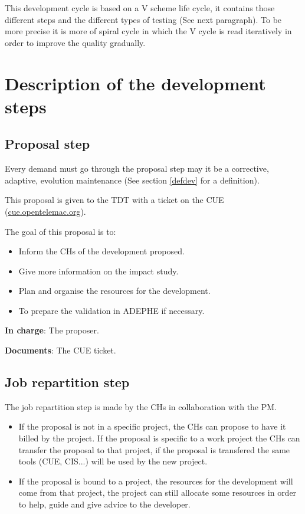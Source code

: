 This development cycle is based on a V scheme life cycle, it contains those
different steps and the different types of testing (See next paragraph). To be
more precise it is more of spiral cycle in which the V cycle is read
iteratively in order to improve the quality gradually. 

\section{Description of the development steps}
\label{dev}

\subsection{Proposal step}

Every demand must go through the proposal step may it be a corrective,
adaptive, evolution maintenance (See section \ref{defdev} for a definition).

This proposal is given to the TDT with a ticket on the CUE (\url{cue.opentelemac.org}).

The goal of this proposal is to:
\begin{itemize}
\item Inform the CHs of the development proposed.
\item Give more information on the impact study.
\item Plan and organise the resources for the development.
\item To prepare the validation in ADEPHE if necessary.
\end{itemize}

\textbf{In charge}: The proposer.

\textbf{Documents}: The CUE ticket.

\subsection{Job repartition step}
The job repartition step is made by the CHs in collaboration with the PM.
\begin{itemize}
\item If the proposal is not in a specific project, the CHs can propose to have
it billed by the \telemacsystem project. If the proposal is specific to a work project
the CHs can transfer the proposal to that project, if the proposal is
transfered the same tools (CUE, CIS...) will be used by the new project.
\item If the proposal is bound to a project, the resources for the development
will come from that project, the \telemacsystem project can still allocate some
resources in order to help, guide and give advice to the developer.
\end{itemize}

